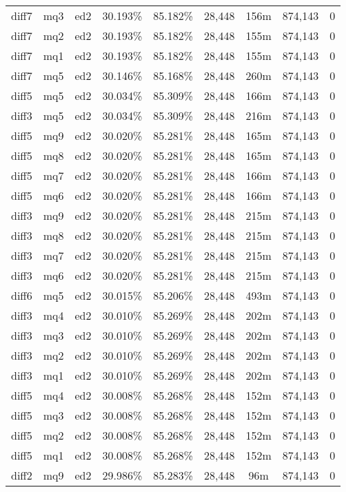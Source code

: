 \begin{landscape}
\begin{longtable}{|c|c|c||c|c||c|c|c|c|}
diff7 & mq3 & ed2 & 30.193\% & 85.182\% & 28,448 & 156m & 874,143 & 0 \\
diff7 & mq2 & ed2 & 30.193\% & 85.182\% & 28,448 & 155m & 874,143 & 0 \\
diff7 & mq1 & ed2 & 30.193\% & 85.182\% & 28,448 & 155m & 874,143 & 0 \\
diff7 & mq5 & ed2 & 30.146\% & 85.168\% & 28,448 & 260m & 874,143 & 0 \\
diff5 & mq5 & ed2 & 30.034\% & 85.309\% & 28,448 & 166m & 874,143 & 0 \\
diff3 & mq5 & ed2 & 30.034\% & 85.309\% & 28,448 & 216m & 874,143 & 0 \\
diff5 & mq9 & ed2 & 30.020\% & 85.281\% & 28,448 & 165m & 874,143 & 0 \\
diff5 & mq8 & ed2 & 30.020\% & 85.281\% & 28,448 & 165m & 874,143 & 0 \\
diff5 & mq7 & ed2 & 30.020\% & 85.281\% & 28,448 & 166m & 874,143 & 0 \\
diff5 & mq6 & ed2 & 30.020\% & 85.281\% & 28,448 & 166m & 874,143 & 0 \\
diff3 & mq9 & ed2 & 30.020\% & 85.281\% & 28,448 & 215m & 874,143 & 0 \\
diff3 & mq8 & ed2 & 30.020\% & 85.281\% & 28,448 & 215m & 874,143 & 0 \\
diff3 & mq7 & ed2 & 30.020\% & 85.281\% & 28,448 & 215m & 874,143 & 0 \\
diff3 & mq6 & ed2 & 30.020\% & 85.281\% & 28,448 & 215m & 874,143 & 0 \\
diff6 & mq5 & ed2 & 30.015\% & 85.206\% & 28,448 & 493m & 874,143 & 0 \\
diff3 & mq4 & ed2 & 30.010\% & 85.269\% & 28,448 & 202m & 874,143 & 0 \\
diff3 & mq3 & ed2 & 30.010\% & 85.269\% & 28,448 & 202m & 874,143 & 0 \\
diff3 & mq2 & ed2 & 30.010\% & 85.269\% & 28,448 & 202m & 874,143 & 0 \\
diff3 & mq1 & ed2 & 30.010\% & 85.269\% & 28,448 & 202m & 874,143 & 0 \\
diff5 & mq4 & ed2 & 30.008\% & 85.268\% & 28,448 & 152m & 874,143 & 0 \\
diff5 & mq3 & ed2 & 30.008\% & 85.268\% & 28,448 & 152m & 874,143 & 0 \\
diff5 & mq2 & ed2 & 30.008\% & 85.268\% & 28,448 & 152m & 874,143 & 0 \\
diff5 & mq1 & ed2 & 30.008\% & 85.268\% & 28,448 & 152m & 874,143 & 0 \\
diff2 & mq9 & ed2 & 29.986\% & 85.283\% & 28,448 & 96m & 874,143 & 0 \\

\end{longtable}
\end{landscape}
